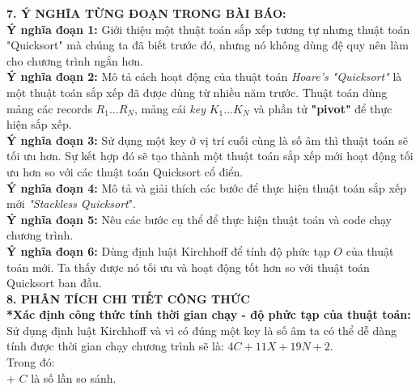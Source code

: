 \documentclass[12pt,a4paper]{article}
\begin{document}
{      \noindent\textbf{7. Ý NGHĨA TỪNG ĐOẠN TRONG BÀI BÁO: }\\
       \textbullet \hspace{0.5cm} \textbf{Ý nghĩa đoạn 1: } Giới thiệu một thuật toán sắp xếp tương tự nhưng thuật toán "Quicksort" mà chúng ta đã biết trước đó, nhưng nó không dùng đệ quy nên làm cho chương trình ngắn hơn.\\
          \textbullet \hspace{0.5cm} \textbf{Ý nghĩa đoạn 2: } Mô tả cách hoạt động của thuật toán \textit{Hoare's "Quicksort"} là một thuật toán sắp xếp đã được dùng từ nhiều năm trước. Thuật toán dùng mảng các records $ R_1...R_N $, mảng cái \textit{key} $ K_1...K_N $ và phần tử \textbf{"pivot"} để thực hiện sắp xếp.\\
            \textbullet \hspace{0.5cm} \textbf{Ý nghĩa đoạn 3: } Sử dụng một key ở vị trí cuối cùng là số âm thì thuật toán sẽ tối ưu hơn. Sự kết hợp đó sẽ tạo thành một thuật toán sắp xếp mới hoạt động tối ưu hơn so với các thuật toán Quicksort cổ điển.\\
                 \textbullet \hspace{0.5cm} \textbf{Ý nghĩa đoạn 4: } Mô tả và giải thích các bước để thực hiện thuật toán sắp xếp mới \textit{"Stackless Quicksort}".\\
                    \textbullet \hspace{0.5cm} \textbf{Ý nghĩa đoạn 5:} Nêu các bước cụ thể để thực hiện thuật toán và code chạy chương trình.\\
                        \textbullet \hspace{0.5cm} \textbf{Ý nghĩa đoạn 6:} Dùng định luật Kirchhoff để tính độ phức tạp $ O $ của thuật toán mới. Ta thấy được nó tối ưu và hoạt động tốt hơn so với thuật toán Quicksort ban đầu.\\
                        \newpage
      \noindent\textbf{8. PHÂN TÍCH CHI TIẾT CÔNG THỨC }   \\
    \textbf{  *Xác định công thức tính thời gian chạy - độ phức tạp của thuật toán: } \\
         \textbullet \hspace{0.3cm} Sử dụng định luật Kirchhoff và vì có đúng một key là số âm ta có thể dễ dàng tính được thời gian chạy chương trình sẽ là: $ 4C+11X+19N+2 $.\\
         Trong đó:\\  
       \indent + $ C $   là số lần so sánh.\\
}
\end{document}
